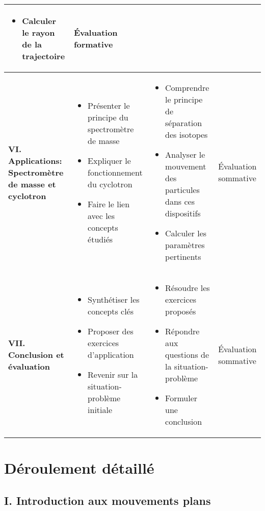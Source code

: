 \documentclass[12pt]{article}
\begin{document}
\begin{table}[htbp]
\begin{tabular}{|p{4cm}|p{5.5cm}|p{5.5cm}|p{1.5cm}|}
\begin{itemize}
    \item Calculer le rayon de la trajectoire
\end{itemize} &
Évaluation formative \\
\hline
\textbf{VI. Applications: Spectromètre de masse et cyclotron} & 
\begin{itemize}
    \item Présenter le principe du spectromètre de masse
    \item Expliquer le fonctionnement du cyclotron
    \item Faire le lien avec les concepts étudiés
\end{itemize} & 
\begin{itemize}
    \item Comprendre le principe de séparation des isotopes
    \item Analyser le mouvement des particules dans ces dispositifs
    \item Calculer les paramètres pertinents
\end{itemize} &
Évaluation sommative \\
\hline
\textbf{VII. Conclusion et évaluation} & 
\begin{itemize}
    \item Synthétiser les concepts clés
    \item Proposer des exercices d'application
    \item Revenir sur la situation-problème initiale
\end{itemize} & 
\begin{itemize}
    \item Résoudre les exercices proposés
    \item Répondre aux questions de la situation-problème
    \item Formuler une conclusion
\end{itemize} &
Évaluation sommative \\
\hline
\end{tabular}
\end{table}

\section*{Déroulement détaillé}

\subsection*{I. Introduction aux mouvements plans}
\end{document}
